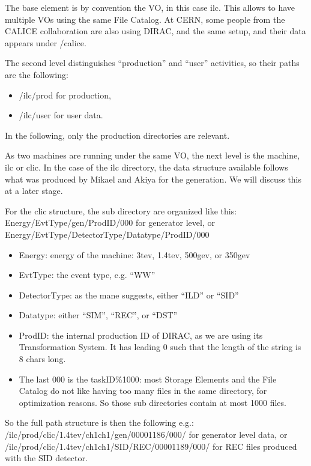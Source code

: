 \documentclass[a4paper,12pt]{article}
\begin{document}
The base element is by convention the VO, in this case ilc. This allows to have
multiple VOs using the same File Catalog. At CERN, some people from the CALICE
collaboration are also using DIRAC, and the same setup, and their data appears
under /calice.

The second level distinguishes ``production'' and ``user'' activities, so their
paths are the following:
\begin{itemize}
  \item /ilc/prod for production,
  \item /ilc/user for user data.
\end{itemize} 
In the following, only the production directories are relevant. 

As two machines are running under the same VO, the next level is the machine,
ilc or clic.  In the case of the ilc directory, the data structure available
follows what was produced by Mikael and Akiya for the generation. We will
discuss this at a later stage.

For the clic structure, the sub directory are organized like this:
Energy/EvtType/gen/ProdID/000 for generator level, or
Energy/EvtType/DetectorType/Datatype/ProdID/000
\begin{itemize}
  \item Energy: energy of the machine: 3tev, 1.4tev, 500gev, or 350gev
  \item EvtType: the event type, e.g. ``WW''
  \item DetectorType: as the mane suggests, either ``ILD'' or ``SID''
  \item Datatype: either ``SIM'', ``REC'', or ``DST''
  \item ProdID: the internal production ID of DIRAC, as we are using its
  Transformation System. It has leading 0 such that the length of the string is
  8 chars long.
  \item The last 000 is the taskID\%1000: most Storage Elements and the File
  Catalog do not like having too many files in the same directory, for
  optimization reasons. So those sub directories contain at most 1000 files.
\end{itemize}

So the full path structure is then the following e.g.:\\
/ilc/prod/clic/1.4tev/ch1ch1/gen/00001186/000/ for generator level data, or \\
/ilc/prod/clic/1.4tev/ch1ch1/SID/REC/00001189/000/ for REC files produced with
the SID detector.
\end{document}
